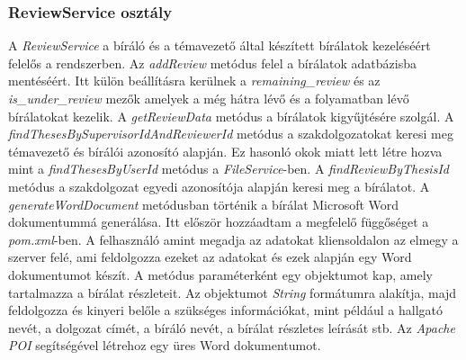 \subsubsection{ReviewService osztály}

A \textit{ReviewService} a bíráló és a témavezető által készített bírálatok kezeléséért felelős a rendszerben. Az \textit{addReview} metódus felel a bírálatok adatbázisba mentéséért. Itt külön beállításra kerülnek a \textit{remaining\_review} és az \textit{is\_under\_review} mezők amelyek a még hátra lévő és a folyamatban lévő bírálatokat kezelik. A \textit{getReviewData} metódus a bírálatok kigyűjtésére szolgál. A \textit{findThesesBySupervisorIdAndReviewerId} metódus a szakdolgozatokat keresi meg témavezető és bírálói azonosító alapján. Ez hasonló okok miatt lett létre hozva mint a \textit{findThesesByUserId} metódus a \textit{FileService}-ben. A \textit{findReviewByThesisId} metódus a szakdolgozat egyedi azonosítója alapján keresi meg a bírálatot. A \textit{generateWordDocument} metódusban történik a bírálat Microsoft Word dokumentummá generálása. Itt először hozzáadtam a megfelelő függőséget a \textit{pom.xml}-ben. A felhasználó amint megadja az adatokat kliensoldalon az elmegy a szerver felé, ami feldolgozza ezeket az adatokat és ezek alapján egy Word dokumentumot készít. A metódus paraméterként egy objektumot kap, amely tartalmazza a bírálat részleteit. Az objektumot \textit{String} formátumra alakítja, majd feldolgozza és kinyeri belőle a szükséges információkat, mint például a hallgató nevét, a dolgozat címét, a bíráló nevét, a bírálat részletes leírását stb. Az \textit{Apache POI} \cite{Apache POI} segítségével létrehoz egy üres Word dokumentumot.
